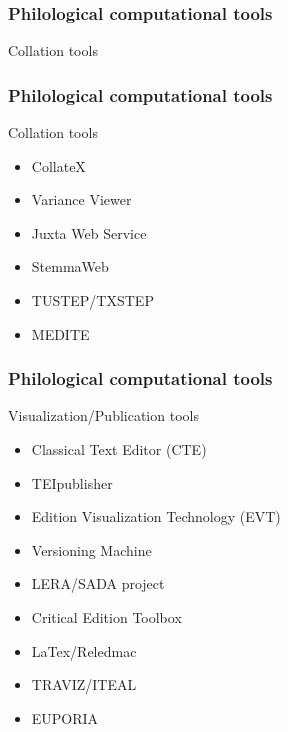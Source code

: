 \begin{frame}
	\frametitle{Philological computational tools}
	\addtocounter{nframe}{1}
    \begin{block}{Collation tools}
            
		\begin{block}
		\end{block}
	\end{block}
\end{frame}

\begin{frame}
	\frametitle{Philological computational tools}
	\addtocounter{nframe}{1}
    \begin{block}{Collation tools}
		\begin{itemize}
			\item CollateX
			\item Variance Viewer
			\item Juxta Web Service
			\item StemmaWeb
			\item TUSTEP/TXSTEP
			\item MEDITE
		\end{itemize}
	\end{block}
\end{frame}

\begin{frame}
	\frametitle{Philological computational tools}
	\addtocounter{nframe}{1}
    \begin{block}{Visualization/Publication tools}
		\begin{itemize}
			\item Classical Text Editor (CTE)
			\item TEIpublisher
			\item Edition Visualization Technology (EVT)
			\item Versioning Machine
			\item LERA/SADA project
			\item Critical Edition Toolbox
			\item LaTex/Reledmac
			\item TRAVIZ/ITEAL
			\item EUPORIA
		\end{itemize}
	\end{block}
\end{frame}

